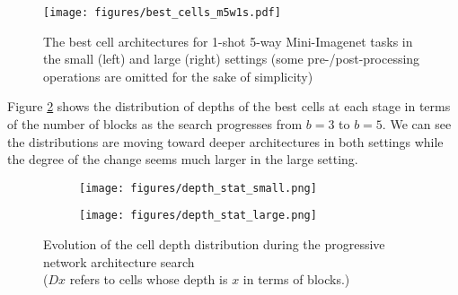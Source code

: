 \documentclass{article}
\begin{document}
\begin{figure}[h!]
\centering
\texttt{[image: figures/best\_cells\_m5w1s.pdf]}
\caption{The best cell architectures for 1-shot 5-way Mini-Imagenet tasks in the small (left) and large (right) settings (some pre-/post-processing operations are omitted for the sake of simplicity)}
\label{fig:best_cells}
\end{figure}%
Figure \ref{fig:depth_stats} shows the distribution of depths of the best cells at each stage in terms of the number of blocks as the search progresses from $b=3$ to $b=5$. We can see the distributions are moving toward deeper architectures in both settings while the degree of the change seems much larger in the large setting.

\begin{figure}[h!]
	\begin{subfigure}[t]{0.49\textwidth}
	\texttt{[image: figures/depth\_stat\_small.png]}
	\end{subfigure}
	\begin{subfigure}[t]{0.49\textwidth}
	\texttt{[image: figures/depth\_stat\_large.png]}
	\end{subfigure}
        
\caption{Evolution of the cell depth distribution during the progressive network architecture search\\
         ($Dx$ refers to cells whose depth is $x$ in terms of blocks.)}
\label{fig:depth_stats}
\end{figure}
\end{document}
